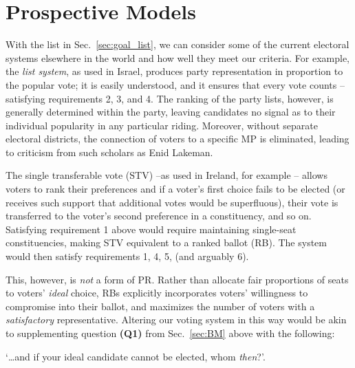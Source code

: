 \documentclass[DIV=calc, paper=a4, fontsize=11pt, twocolumn]{scrartcl}	 %
\begin{document}
\section{Prospective Models}
\label{sec:alt_models}

With the list in Sec.~\ref{sec:goal_list}, we can consider some of the current electoral systems elsewhere in the world and how well they meet our criteria. For example, the \emph{list system}, as used in Israel, produces party representation in proportion to the popular vote; it is easily understood, and it ensures that every vote counts \---satisfying requirements 2, 3, and 4. 
The ranking of the party lists, however, is generally determined within the party, leaving candidates no signal as to their individual popularity in any particular riding. Moreover, without separate electoral districts, the connection of voters to a specific MP is eliminated, leading to criticism from such scholars as Enid Lakeman\cite{Lakeman}.

The single transferable vote (STV) \---as used in Ireland, for example\cite{Irish_howto_vote_doc}
\--- allows voters to  rank their preferences and if a voter's first choice fails to be elected (or receives such support that additional votes would be superfluous), their vote is transferred to the voter's second preference in a constituency, and so on. 
Satisfying requirement 1 above would require maintaining single-seat constituencies, making STV equivalent to a ranked ballot (RB). The system would then satisfy requirements 1, 4, 5, (and arguably 6). 

This, however, is \emph{not} a form of PR. 
Rather than allocate fair proportions of seats to voters' \emph{ideal} choice, RBs explicitly incorporates voters' willingness to compromise into their ballot, and maximizes the number of voters with a \emph{satisfactory} representative.
Altering our voting system in this way would be akin to supplementing question \textbf{(Q1)} from Sec.~\ref{sec:BM} above with the following: 

\begin{tcolorbox}[colback=white!5!white,colframe=blue!55!black]
`\ldots and if your ideal candidate cannot be elected, whom \emph{then}?'. 
\end{tcolorbox}
\end{document}
